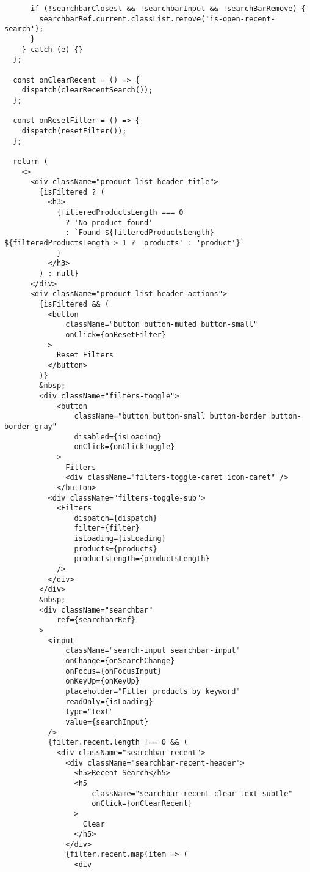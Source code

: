 \begin{lstlisting}
      if (!searchbarClosest && !searchbarInput && !searchBarRemove) {
        searchbarRef.current.classList.remove('is-open-recent-search');
      }
    } catch (e) {}
  };

  const onClearRecent = () => {
    dispatch(clearRecentSearch());
  };

  const onResetFilter = () => {
    dispatch(resetFilter());
  };

  return (
    <>
      <div className="product-list-header-title">
        {isFiltered ? (
          <h3>
            {filteredProductsLength === 0
              ? 'No product found'
              : `Found ${filteredProductsLength} ${filteredProductsLength > 1 ? 'products' : 'product'}`
            }
          </h3>
        ) : null}
      </div>
      <div className="product-list-header-actions">
        {isFiltered && (
          <button
              className="button button-muted button-small"
              onClick={onResetFilter}
          >
            Reset Filters
          </button>
        )}
        &nbsp;
        <div className="filters-toggle">
            <button
                className="button button-small button-border button-border-gray"
                disabled={isLoading}
                onClick={onClickToggle}
            >
              Filters
              <div className="filters-toggle-caret icon-caret" />
            </button>
          <div className="filters-toggle-sub">
            <Filters
                dispatch={dispatch}
                filter={filter}
                isLoading={isLoading}
                products={products}
                productsLength={productsLength}
            />
          </div>
        </div>
        &nbsp;
        <div className="searchbar"
            ref={searchbarRef}
        >
          <input
              className="search-input searchbar-input"
              onChange={onSearchChange}
              onFocus={onFocusInput}
              onKeyUp={onKeyUp}
              placeholder="Filter products by keyword"
              readOnly={isLoading}
              type="text"
              value={searchInput}
          />
          {filter.recent.length !== 0 && (
            <div className="searchbar-recent">
              <div className="searchbar-recent-header">
                <h5>Recent Search</h5>
                <h5
                    className="searchbar-recent-clear text-subtle"
                    onClick={onClearRecent}
                >
                  Clear
                </h5>
              </div>
              {filter.recent.map(item => (
                <div

\end{lstlisting}
